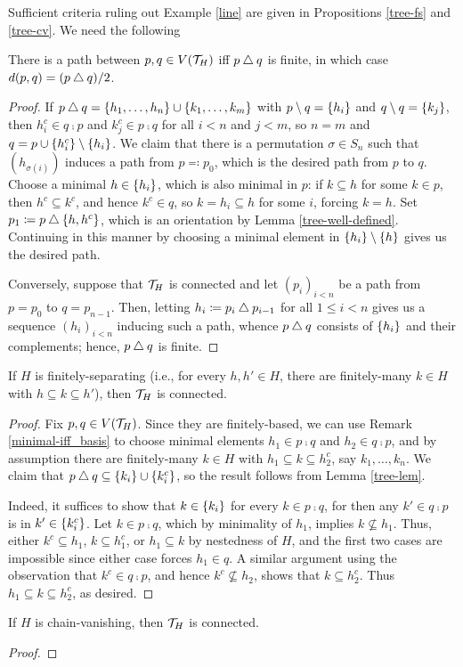 \documentclass{amsart}
\begin{document}
    Sufficient criteria ruling out Example \ref{line} are given in Propositions \ref{tree-fs} and \ref{tree-cv}. We need the following

    \begin{lemma}\label{tree-lem}
        There is a path between $p,q\in V(\mathcal{T}_H)$ iff $p\bigtriangleup q$ is finite, in which case $d(p,q)=(p\bigtriangleup q)/2$.
    \end{lemma}
    \begin{proof}
        If $p\bigtriangleup q=\left\{h_1,\dots,h_n\right\}\cup\left\{k_1,\dots,k_m\right\}$ with $p\setminus q=\left\{h_i\right\}$ and $q\setminus q=\left\{k_j\right\}$, then $h_i^c\in q\comp p$ and $k_j^c\in p\comp q$ for all $i<n$ and $j<m$, so $n=m$ and $q=p\cup\left\{h_i^c\right\}\setminus\left\{h_i\right\}$. We claim that there is a permutation $\sigma\in S_n$ such that $(h_{\sigma(i)})$ induces a path from $p\eqqcolon p_0$, which is the desired path from $p$ to $q$. Choose a minimal $h\in\left\{h_i\right\}$, which is also minimal in $p$: if $k\subseteq h$ for some $k\in p$, then $h^c\subseteq k^c$, and hence $k^c\in q$, so $k=h_i\subseteq h$ for some $i$, forcing $k=h$. Set $p_1\coloneqq p\bigtriangleup\left\{h,h^c\right\}$, which is an orientation by Lemma \ref{tree-well-defined}. Continuing in this manner by choosing a minimal element in $\left\{h_i\right\}\setminus\left\{h\right\}$ gives us the desired path.

        Conversely, suppose that $\mathcal{T}_H$ is connected and let $(p_i)_{i<n}$ be a path from $p=p_0$ to $q=p_{n-1}$. Then, letting $h_i\coloneqq p_i\bigtriangleup p_{i-1}$ for all $1\leq i<n$ gives us a sequence $(h_i)_{i<n}$ inducing such a path, whence $p\bigtriangleup q$ consists of $\left\{h_i\right\}$ and their complements; hence, $p\bigtriangleup q$ is finite.
    \end{proof}

    \begin{proposition}\label{tree-fs}
        If $H$ is finitely-separating (i.e., for every $h,h'\in H$, there are finitely-many $k\in H$ with $h\subseteq k\subseteq h'$), then $\mathcal{T}_H$ is connected.
    \end{proposition}
    \begin{proof}
        Fix $p,q\in V(\mathcal{T}_H)$. Since they are finitely-based, we can use Remark \ref{minimal-iff_basis} to choose minimal elements $h_1\in p\comp q$ and $h_2\in q\comp p$, and by assumption there are finitely-many $k\in H$ with $h_1\subseteq k\subseteq h_2^c$, say $k_1,\dots,k_n$. We claim that $p\bigtriangleup q\subseteq\left\{k_i\right\}\cup\left\{k_i^c\right\}$, so the result follows from Lemma \ref{tree-lem}.

        Indeed, it suffices to show that $k\in\left\{k_i\right\}$ for every $k\in p\comp q$, for then any $k'\in q\comp p$ is in $k'\in\left\{k_i^c\right\}$. Let $k\in p\comp q$, which by minimality of $h_1$, implies $k\not\subseteq h_1$. Thus, either $k^c\subseteq h_1$, $k\subseteq h_1^c$, or $h_1\subseteq k$ by nestedness of $H$, and the first two cases are impossible since either case forces $h_1\in q$. A similar argument using the observation that $k^c\in q\comp p$, and hence $k^c\not\subseteq h_2$, shows that $k\subseteq h_2^c$. Thus $h_1\subseteq k\subseteq h_2^c$, as desired.
    \end{proof}

    \begin{proposition}\label{tree-cv}
        If $H$ is chain-vanishing, then $\mathcal{T}_H$ is connected.
    \end{proposition}
    \begin{proof}
        
    \end{proof}
\end{document}
